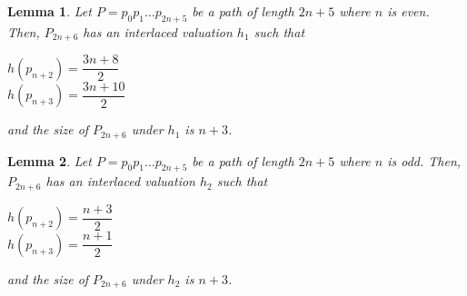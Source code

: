 \documentclass[a4paper, 11pt]{article}
\newtheorem{lem}{Lemma}
\begin{document}
\begin{lem} Let $P=p_0 p_1 \dots p_{2n+5}$ be a path of length $2n+5$ where $n$ is even. Then, $P_{2n+6}$ has an interlaced valuation $h_1$ such that 
\begin{center}
      $h(p_{n+2})=\dfrac{3n+8}{2}$\\
      $h(p_{n+3})= \dfrac{3n+10}{2}$
\end{center}
and the size of $P_{2n+6}$ under $h_1$ is $n+3$.
\end{lem}

\begin{lem} Let $P=p_0 p_1 \dots p_{2n+5}$ be a path of length $2n+5$ where $n$ is odd. Then, $P_{2n+6}$ has an interlaced valuation $h_2$ such that 
\begin{center}
      $h(p_{n+2})=\dfrac{n+3}{2}$\\
      $h(p_{n+3})= \dfrac{n+1}{2}$
\end{center}
and the size of $P_{2n+6}$ under $h_2$ is $n+3$.
\end{lem}
\end{document}
